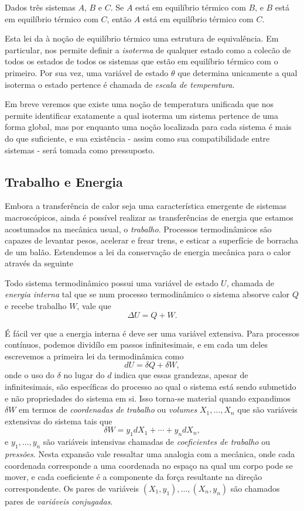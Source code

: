 \begin{law}
    Dados três sistemas $A$, $B$ e $C$. Se $A$ está em equilíbrio térmico com 
    $B$, e $B$ está em equilíbrio térmico com $C$, então $A$ está em equilíbrio
    térmico com $C$.
\end{law}

Esta lei da à noção de equilíbrio térmico uma estrutura de equivalência. Em
particular, nos permite definir a \emph{isoterma} de qualquer estado como a
colecão de todos os estados de todos os sistemas que estão em equilíbrio térmico
com o primeiro. Por sua vez, uma variável de estado $\theta$ que determina
unicamente a qual isoterma o estado pertence é chamada de \emph{escala de
temperatura}. 

Em breve veremos que existe uma noção de temperatura unificada que nos permite
identificar exatamente a qual isoterma um sistema pertence de uma forma global,
mas por enquanto uma noção localizada para cada sistema é mais do que
suficiente, e sua existência - assim como sua compatibilidade entre sistemas -
será tomada como pressuposto. 

\subsection{Trabalho e Energia}

Embora a transferência de calor seja uma característica emergente de sistemas
macroscópicos, ainda é possível realizar as transferências de energia que
estamos acostumados na mecânica usual, o \emph{trabalho}. Processos
termodinâmicos são capazes de levantar pesos, acelerar e frear trens, e esticar
a superfície de borracha de um balão. Estendemos a lei da conservação de energia
mecânica para o calor através da seguinte

\begin{law}
    Todo sistema termodinâmico possui uma variável de estado $U$, chamada de
    \emph{energia interna} tal que se num processo termodinâmico o sistema
    absorve calor $Q$ e recebe trabalho $W$, vale que 
    $$\Delta U=Q+W.$$
\end{law}

É fácil ver que a energia interna é deve ser uma variável extensiva. Para
processos contínuos, podemos dividílo em passos infinitesimais, e em cada um
deles escrevemos a primeira lei da termodinâmica como
$$dU=\delta Q+\delta W,$$
onde o uso do $\delta$ no lugar do $d$ indica que essas grandezas, apesar de
infinitesimais, são específicas
do processo ao qual o sistema está sendo submetido e não propriedades do sistema
em si. Isso torna-se material quando expandimos $\delta W$ em termos de \emph{
coordenadas de trabalho} ou \emph{volumes} $X_1,\dots,X_n$ que são variáveis
extensivas do sistema tais que 
$$\delta W=y_1dX_1+\cdots+y_ndX_n,$$
e $y_1,\dots,y_n$ são variáveis intensivas chamadas de \emph{coeficientes de
trabalho} ou \emph{pressões}. Nesta expansão vale ressaltar uma analogia com a
mecânica, onde cada coordenada corresponde a uma coordenada no espaço na qual um
corpo pode se mover, e cada coeficiente é a componente da força resultante na
direção correspondente. Os pares de variáveis $(X_1, y_1),\dots,(X_n,y_n)$ são
chamados pares de \emph{variáveis conjugadas}.

